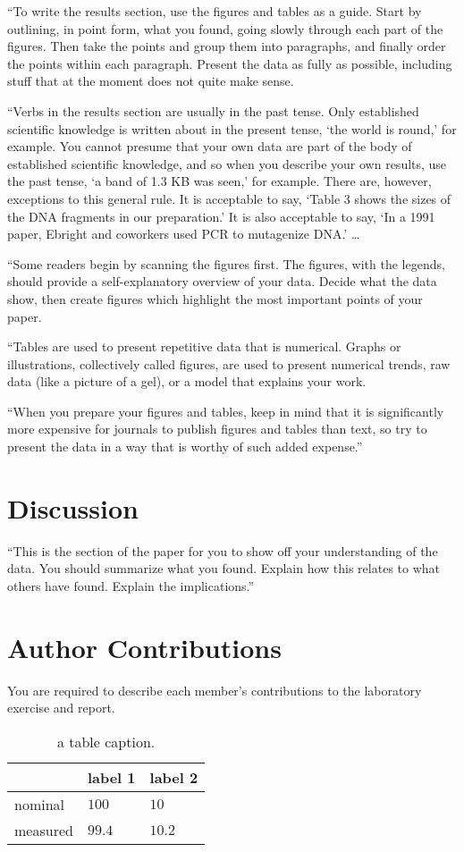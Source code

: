\documentclass[10pt,twocolumn]{article}
\begin{document}
``To write the results section, use the figures and tables as a guide. Start by outlining, in point form, what you found, going slowly through each part of the figures. Then take the points and group them into paragraphs, and finally order the points within each paragraph. Present the data as fully as possible, including stuff that at the moment does not quite make sense.

``Verbs in the results section are usually in the past tense. Only established scientific knowledge is written about in the present tense, `the world is round,' for example. You cannot presume that your own data are part of the body of established scientific knowledge, and so when you describe your own results, use the past tense, `a band of 1.3 KB was seen,' for example. There are, however, exceptions to this general rule. It is acceptable to say, `Table 3 shows the sizes of the DNA fragments in our preparation.' It is also acceptable to say, `In a 1991 paper, Ebright and coworkers used PCR to mutagenize DNA.' \ldots

``Some readers begin by scanning the figures first. The figures, with the legends, should provide a self-explanatory overview of your data. Decide what the data show, then create figures which highlight the most important points of your paper.

``Tables are used to present repetitive data that is numerical. Graphs or illustrations, collectively called figures, are used to present numerical trends, raw data (like a picture of a gel), or a model that explains your work.

``When you prepare your figures and tables, keep in mind that it is significantly more expensive for journals to publish figures and tables than text, so try to present the data in a way that is worthy of such added expense.''

\section{Discussion}

``This is the section of the paper for you to show off your understanding of the data. You should summarize what you found. Explain how this relates to what others have found. Explain the implications.''

\section{Author Contributions}

You are required to describe each member's contributions to the laboratory exercise and report.




 
\begin{table}[bt]
	\begin{tabularx}{1\linewidth}{ lXX }
		\hline
		 & \textbf{label 1} & \textbf{label 2} \\
		\hline
		nominal & $100$ & $10$ \\
		measured & $99.4$ & $10.2$ \\
		\hline
	\end{tabularx}
	\caption{a table caption.}
	\label{tab:dummy}
\end{table}
\end{document}
